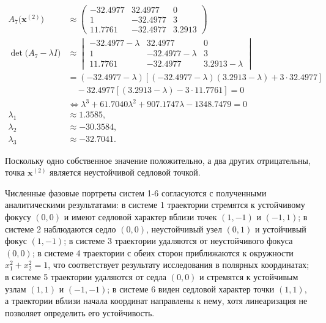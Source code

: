 \begin{equation}
  \begin{aligned}
    A_7\bigl(\bm x^{(2)}\bigr)
    &\approx
    \begin{pmatrix}
      -32.4977 & 32.4977 & 0\\
      1 & -32.4977 & 3\\
      11.7761 & -32.4977 & 3.2913
    \end{pmatrix}\\
    \det\bigl(A_7-\lambda I\bigr)
    &\approx
    \begin{vmatrix}
      -32.4977-\lambda & 32.4977 & 0\\
      1 & -32.4977-\lambda & 3\\
      11.7761 & -32.4977 & 3.2913-\lambda
    \end{vmatrix}\\
    &=(-32.4977-\lambda)
      \left[(-32.4977-\lambda)(3.2913-\lambda)
      +3\cdot32.4977\right]\\
    &\quad
      -32.4977\left[(3.2913-\lambda)-3\cdot11.7761\right]=0\\
    &\Longleftrightarrow
      \lambda^3+61.7040\lambda^2
      +907.1747\lambda-1348.7479=0\\
    \lambda_1&\approx1.3585,\\
    \lambda_2&\approx-30.3584,\\
    \lambda_3&\approx-32.7041.
  \end{aligned}
\end{equation}

Поскольку одно собственное значение положительно, а два других отрицательны,
точка $\bm x^{(2)}$ является неустойчивой седловой точкой.

Численные фазовые портреты систем 1-6 согласуются с полученными
аналитическими результатами: в системе 1 траектории стремятся к устойчивому
фокусу $(0,0)$ и имеют седловой характер вблизи точек $(1,-1)$ и $(-1,1)$;
в системе 2 наблюдаются седло $(0,0)$, неустойчивый узел $(0,1)$ и устойчивый
фокус $(1,-1)$; в системе 3 траектории удаляются от неустойчивого фокуса
$(0,0)$; в системе 4 траектории с обеих сторон приближаются к окружности
$x_1^2+x_2^2=1$, что соответствует результату исследования в полярных
координатах; в системе 5 траектории удаляются от седла $(0,0)$ и стремятся
к устойчивым узлам $(1,1)$ и $(-1,-1)$; в системе 6 виден седловой характер
точки $(1,1)$, а траектории вблизи начала координат направлены к нему,
хотя линеаризация не позволяет определить его устойчивость.

